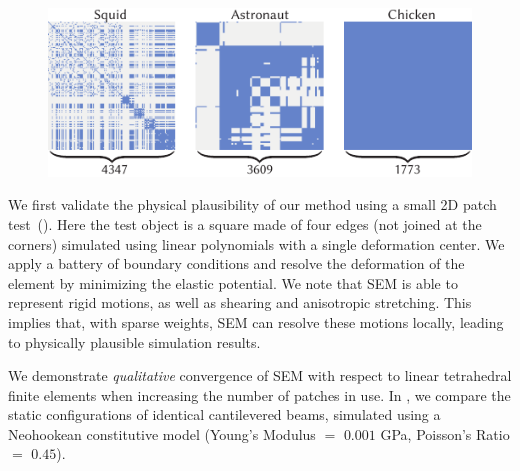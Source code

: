 \begin{figure}[h]
  \includegraphics[width=\columnwidth]{figures/stiffness_sparsity.pdf}
  \caption{}
  \label{fig:stiffness_sparsity}
\end{figure}

We first validate the physical plausibility of our method using a small 2D patch test~(). 
Here the test object is a square made of four edges (not joined at the corners) simulated using linear polynomials with a single deformation center.
We apply a battery of boundary conditions and resolve the deformation of the element by minimizing the elastic potential.
We note that SEM is able to represent rigid motions, as well as shearing and anisotropic stretching. 
This implies that, with sparse weights, SEM can resolve these motions locally, leading to physically plausible simulation results.


We demonstrate \emph{qualitative} convergence of SEM with respect to linear tetrahedral finite elements when increasing the number of patches in use.
In , we compare the static configurations of identical cantilevered beams, simulated using a Neohookean constitutive model (Young's Modulus $=$ $0.001$ GPa, Poisson's Ratio $=$ $0.45$). 

